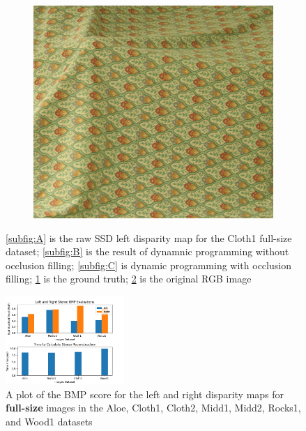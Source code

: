 \documentclass[11pt,a4paper]{article}
\begin{document}
\begin{figure}
\begin{subfigure}[b]{0.2\textwidth}
        \caption{}
        \label{subfig:D}
      \end{subfigure}
      \begin{subfigure}[b]{0.2\textwidth}
        \includegraphics[width=\textwidth]{figures/view5.png}
        \caption{}
        \label{subfig:E}
      \end{subfigure}
    \caption{\ref{subfig:A} is the raw SSD left disparity map for the Cloth1 full-size dataset; \ref{subfig:B} is the result of dynamnic programming without occlusion filling; 
    \ref{subfig:C} is dynamic programming with occlusion filling; \ref{subfig:D} is the ground truth; \ref{subfig:E} is the original RGB image}
    \label{fig:images}
\end{figure}

\begin{figure}
  \centering
  \includegraphics[width=0.40\textwidth]{figures/full_plots.png}
  \caption{A plot of the BMP score for the left and right disparity maps for \textbf{full-size} images in the Aloe, Cloth1, Cloth2, Midd1, Midd2, Rocks1, and Wood1 datasets}
  \label{fig:full_plots}
\end{figure}
\end{document}

